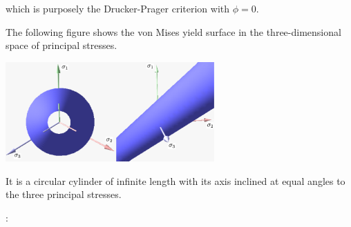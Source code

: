 which is purposely the Drucker-Prager criterion with $\phi=0$.


The following figure shows the von Mises yield surface in the three-dimensional space of principal stresses. 
\begin{center}
\includegraphics[width=0.6\textwidth]{images/rheology/vonmises/vonmises.pdf}
\end{center}
It is a circular cylinder of infinite length with its axis inclined at equal angles to the three principal stresses. 

\Literature: \cite{papa87,long03}

\newpage
